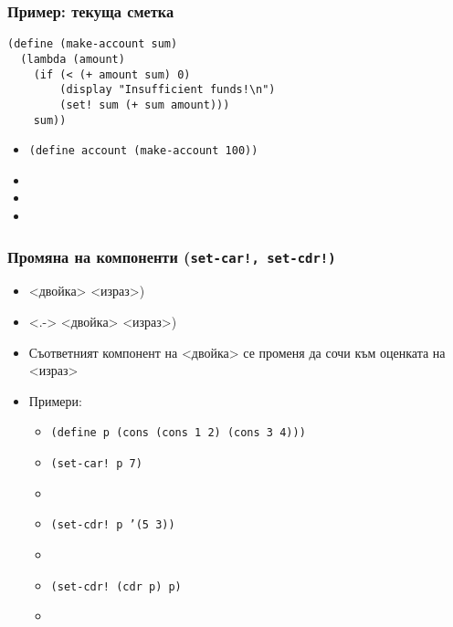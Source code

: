 \documentclass{beamer}
\begin{document}
\begin{frame}[fragile]
  \frametitle{Пример: текуща сметка}

\begin{verbatim}
(define (make-account sum)
  (lambda (amount)
    (if (< (+ amount sum) 0)
        (display "Insufficient funds!\n")
        (set! sum (+ sum amount)))
    sum))
\end{verbatim}
  \onslide<+->
  \begin{itemize}[<+->]
  \item \tt{(define account (make-account 100))}
  \item {}
  \item {}
  \item {}
  \end{itemize}
\end{frame}

\begin{frame}
  \frametitle{Промяна на компоненти (\tt{set-car!}, \tt{set-cdr!})}
  \begin{itemize}[<+->]
  \item {}<двойка> <израз>\tta)
  \item<.-> <двойка> <израз>\tta)
  \item Съответният компонент на <двойка> се променя да сочи към оценката на <израз>
  \item Примери:
    \begin{itemize}
    \item \tt{(define p (cons (cons 1 2) (cons 3 4)))}
    \item \tt{(set-car! p 7)}
    \item {}
    \item \tt{(set-cdr! p '(5 3))}
    \item {}
    \item \tt{(set-cdr! (cdr p) p)}
    \item {}
    \end{itemize}
  \end{itemize}
\end{frame}
\end{document}
